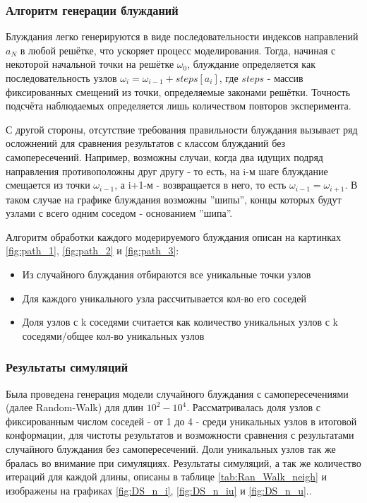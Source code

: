 \subsubsection{Алгоритм генерации блужданий}

Блуждания легко генерируются в виде последовательности индексов направлений $ {a_{N}} $ в любой решётке, что ускоряет процесс моделирования. 
Тогда, начиная с некоторой начальной точки на решётке $\omega_{0}$, блуждание определяется как последовательность узлов $ 
\omega_{i} = \omega_{i-1} + steps\left[a_{i}\right] $, где $steps$ - массив фиксированных смещений из точки, определяемые законами решётки. 
Точность подсчёта наблюдаемых определяется лишь количеством повторов эксперимента.

С другой стороны, отсутствие требования правильности блуждания вызывает ряд осложнений для сравнения результатов с классом блужданий без самопересечений. 
Например, возможны случаи, когда два идущих подряд направления противоположны друг другу - то есть, на i-м шаге блуждание смещается из точки $\omega_{i-1}$, а i+1-м - возвращается в него, то есть $\omega_{i-1} = \omega_{i+1}$.
В таком случае на графике блуждания возможны ''шипы'', концы которых будут узлами с всего одним соседом - основанием ''шипа''. 



Алгоритм обработки каждого модерируемого блуждания описан на картинках \ref{fig:path_1}, \ref{fig:path_2} и \ref{fig:path_3}:
\begin{itemize}
    \item Из случайного блуждания отбираются все уникальные точки узлов
    \item Для каждого уникального узла рассчитывается кол-во его соседей 
    \item Доля узлов с k соседями считается как {количество уникальных узлов с k соседями}/{общее кол-во уникальных узлов}
\end{itemize}

\subsubsection{Результаты симуляций}

Была проведена генерация модели случайного блуждания с самопересечениями (далее Random-Walk) для длин $10^{2}-10^{4}$. 
Рассматривалась доля узлов с фиксированным числом соседей - от 1 до 4 - среди уникальных узлов в итоговой конформации, для чистоты результатов и возможности сравнения с результатами случайного блуждания без самопересечений.
Доли уникальных узлов так же бралась во внимание при симуляциях. 
Результаты симуляций, а так же количество итераций для каждой длины, описаны в таблице \ref{tab:Ran_Walk_neigh} и изображены на графиках \ref{fig:DS_n_i}, \ref{fig:DS_n_iu} и \ref{fig:DS_n_u}.\footnotemark{}.

